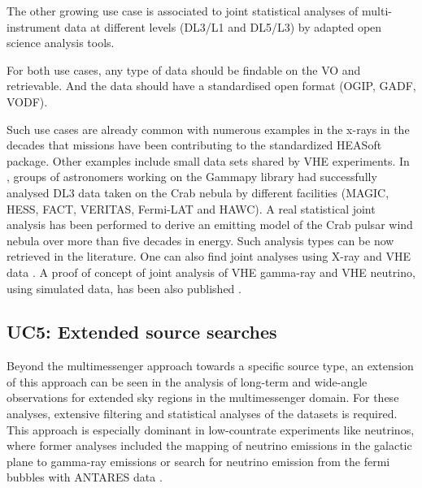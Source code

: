 \documentclass[11pt,a4paper]{ivoa}
\begin{document}
{The other growing use case is associated to joint statistical analyses of multi-instrument data at different levels
(DL3/L1 and DL5/L3) by adapted open science analysis tools.

For both use cases, any type of data should be findable on the \gls{VO} and retrievable. And the data should have a
standardised open format (\gls{OGIP}, \gls{GADF}, \gls{VODF}).

Such use cases are already common with numerous examples in the x-rays in the decades that missions have been contributing to the standardized HEASoft package. Other examples include small data sets shared by \gls{VHE} experiments. In
\citep{2019A&A...625A..10N, 2022A&A...667A..36A}, groups of astronomers working on the Gammapy library had successfully
analysed DL3 data taken on the Crab nebula by different facilities (MAGIC, \gls{HESS}, FACT, VERITAS, Fermi-LAT and HAWC).
A real statistical joint analysis has been performed to derive an emitting model of the Crab pulsar wind nebula over more
than five decades in energy. Such analysis types can be now retrieved in the literature. One can also find joint analyses using X-ray and \gls{VHE} data \citep{giunti2022}. A proof of concept of joint analysis of \gls{VHE} gamma-ray and \gls{VHE} neutrino,
using simulated data, has been also published \citep{unbehaun2024}.

\subsection{UC5: Extended source searches}

Beyond the multimessenger approach towards a specific source type, an extension of this approach can be seen in the analysis
of long-term and wide-angle observations for extended sky regions in the multimessenger domain. For these analyses, extensive filtering
and statistical analyses of the datasets is required. This approach is especially dominant in low-countrate experiments like neutrinos,
where former analyses included the mapping of neutrino emissions in the galactic plane to gamma-ray emissions \citep{doi:10.1126/science.adc9818}
or search for neutrino emission from the fermi bubbles with \gls{ANTARES} data \citep{ANTARES2014}.


}
\end{document}
